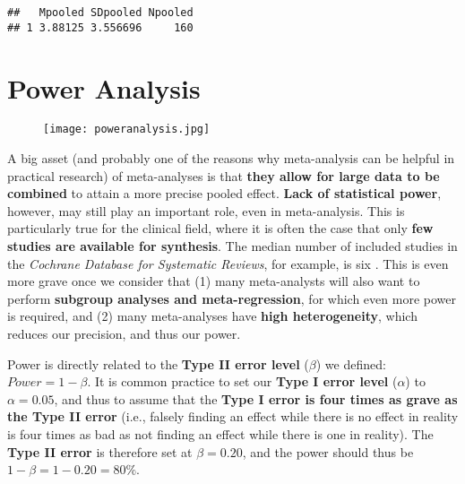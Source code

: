 \documentclass[]{book}
\newenvironment{Shaded}{\begin{snugshade}}{\end{snugshade}}
\newcommand{\KeywordTok}[1]{\textcolor[rgb]{0.13,0.29,0.53}{\textbf{#1}}}
\newcommand{\DataTypeTok}[1]{\textcolor[rgb]{0.13,0.29,0.53}{#1}}
\newcommand{\DecValTok}[1]{\textcolor[rgb]{0.00,0.00,0.81}{#1}}
\newcommand{\FloatTok}[1]{\textcolor[rgb]{0.00,0.00,0.81}{#1}}
\newcommand{\OperatorTok}[1]{\textcolor[rgb]{0.81,0.36,0.00}{\textbf{#1}}}
\newcommand{\NormalTok}[1]{#1}
\theoremstyle{definition}
\theoremstyle{definition}
\theoremstyle{definition}
\theoremstyle{remark}
\begin{document}
\begin{Shaded}
\end{Shaded}

\begin{verbatim}
##   Mpooled SDpooled Npooled
## 1 3.88125 3.556696     160
\end{verbatim}

\chapter{Power Analysis}\label{power-analysis}

\begin{figure}
\centering
\texttt{[image: poweranalysis.jpg]}
\caption{}
\end{figure}

A big asset (and probably one of the reasons why meta-analysis can be
helpful in practical research) of meta-analyses is that \textbf{they
allow for large data to be combined} to attain a more precise pooled
effect. \textbf{Lack of statistical power}, however, may still play an
important role, even in meta-analysis. This is particularly true for the
clinical field, where it is often the case that only \textbf{few studies
are available for synthesis}. The median number of included studies in
the \emph{Cochrane Database for Systematic Reviews}, for example, is six
\citep{borenstein2011}. This is even more grave once we consider that
(1) many meta-analysts will also want to perform \textbf{subgroup
analyses and meta-regression}, for which even more power is required,
and (2) many meta-analyses have \textbf{high heterogeneity}, which
reduces our precision, and thus our power.

Power is directly related to the \textbf{Type II error level}
(\(\beta\)) we defined: \(Power = 1- \beta\). It is common practice to
set our \textbf{Type I error level} (\(\alpha\)) to \(\alpha=0.05\), and
thus to assume that the \textbf{Type I error is four times as grave as
the Type II error} (i.e., falsely finding an effect while there is no
effect in reality is four times as bad as not finding an effect while
there is one in reality). The \textbf{Type II error} is therefore set at
\(\beta=0.20\), and the power should thus be \(1-\beta=1-0.20=80\%\).
\end{document}
